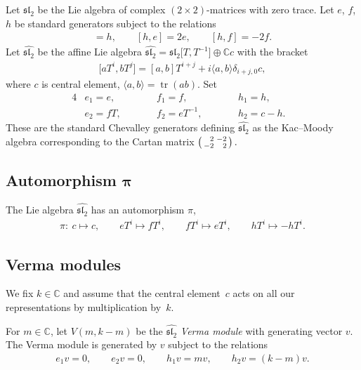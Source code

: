 \documentclass[pdftex]{sigma}
\numberwithin{equation}{section}
\begin{document}
Let $\mathfrak{sl}_2$ be the Lie algebra of complex $(2\times 2)$-matrices with zero trace. Let $e$, $f$, $h$ be standard generators subject to the relations
\begin{gather*}
[e,f]=h,\qquad [h,e]=2e,\qquad [h,f]=-2f.
\end{gather*}
Let $\widehat{{\mathfrak{sl}_2}}$ be the affine Lie algebra $\widehat{{\mathfrak{sl}_2}}=\mathfrak{sl}_2\big[T,T^{-1}\big]\oplus{\mathbb C} c$ with the bracket
\begin{gather*}
\big[aT^i,bT^j\big] = [a,b]T^{i+j} + i \langle a,b\rangle \delta_{i+j,0} c ,
\end{gather*}
where $c$ is central element, $\langle a,b\rangle=\operatorname{tr} (ab)$. Set
\begin{alignat*}{4}
&e_1 = e, \qquad && f_1 = f, \qquad && h_1=h,& \\
& e_2 = fT, \qquad && f_2=eT^{-1}, \qquad && h_2=c-h.&
\end{alignat*}
These are the standard Chevalley generators defining $\widehat{{\mathfrak{sl}_2}}$ as the Kac--Moody algebra correspon\-ding to the Cartan matrix
$\left(\begin{smallmatrix} \hphantom{-}2&-2 \\
-2&\hphantom{-}2 \end{smallmatrix}\right).$

\subsection[Automorphism $\pi$]{Automorphism $\boldsymbol{\pi}$} \label{aut}
The Lie algebra $\widehat{{\mathfrak{sl}_2}}$ has an automorphism $\pi$,
\begin{gather*}
\pi \colon \ c \mapsto c, \qquad eT^i \mapsto fT^i, \qquad fT^i\mapsto eT^i, \qquad hT^i\mapsto -hT^i.
\end{gather*}

\subsection{Verma modules} \label{Ver mod}
We fix $k\in{\mathbb C}$ and assume that the central element~$c$ acts on all our representations by multiplication by~$k$.

For $m\in{\mathbb C}$, let $V(m,k-m)$ be the $\widehat{{\mathfrak{sl}_2}}$ {\em Verma module} with generating vector $v$. The Verma module is generated by $v$ subject to the relations
\begin{gather*}
e_1v=0,\qquad e_2v=0,\qquad h_1v=mv,\qquad h_2v=(k-m)v.
\end{gather*}
\end{document}
